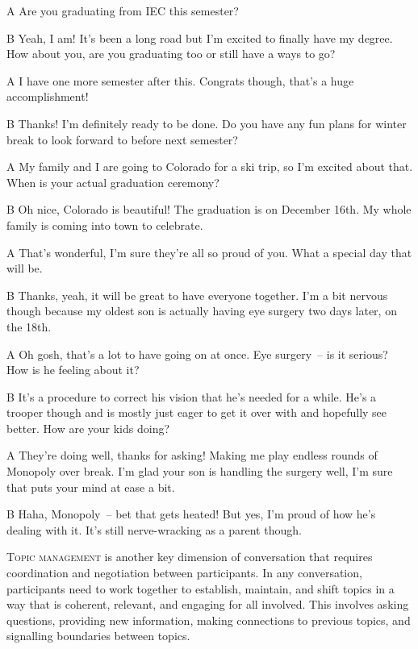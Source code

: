 \begin{dialogue}
    \item[A] Are you graduating from IEC this semester?
    \item[B] Yeah, I am! It's been a long road but I'm excited to finally have my degree. How about you, are you graduating too or still have a ways to go?
    \item[A] I have one more semester after this. Congrats though, that's a huge accomplishment!
    \item[B] Thanks! I'm definitely ready to be done. Do you have any fun plans for winter break to look forward to before next semester?
    \item[A]  My family and I are going to Colorado for a ski trip, so I'm excited about that. When is your actual graduation ceremony?
    \item[B] Oh nice, Colorado is beautiful! The graduation is on December 16th. My whole family is coming into town to celebrate.
    \item[A]  That's wonderful, I'm sure they're all so proud of you. What a special day that will be.
    \item[B] Thanks, yeah, it will be great to have everyone together. I'm a bit nervous though because my oldest son is actually having eye surgery two days later, on the 18th.
    \item[A]  Oh gosh, that's a lot to have going on at once. Eye surgery~-- is it serious? How is he feeling about it?
    \item[B] It's a procedure to correct his vision that he's needed for a while. He's a trooper though and is mostly just eager to get it over with and hopefully see better. How are your kids doing?
    \item[A]  They're doing well, thanks for asking! Making me play endless rounds of Monopoly over break. I'm glad your son is handling the surgery well, I'm sure that puts your mind at ease a bit.
    \item[B] Haha, Monopoly~-- bet that gets heated! But yes, I'm proud of how he's dealing with it. It's still nerve-wracking as a parent though.
\end{dialogue}

\textsc{Topic management} is another key dimension of conversation that requires coordination and negotiation between participants. In any conversation, participants need to work together to establish, maintain, and shift topics in a way that is coherent, relevant, and engaging for all involved. This involves asking questions, providing new information, making connections to previous topics, and signalling boundaries between topics.

